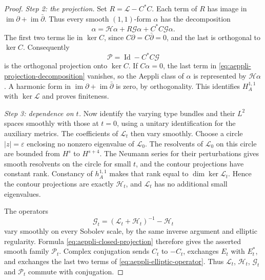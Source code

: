 \begin{proof}
\emph{Step 2: the projection.} Set $R=\mathcal L-C^*C$. Each term of $R$ has image in $\operatorname{im}\partial+\operatorname{im}\bar\partial$. Thus every smooth $(1,1)$-form $\alpha$ has the decomposition
\begin{equation}\label{eq:aeppli-projection-decomposition}
 \alpha=\mathcal H\alpha+R\mathcal G\alpha+C^*C\mathcal G\alpha.
\end{equation}
The first two terms lie in $\ker C$, since $C\partial=C\bar\partial=0$, and the last is orthogonal to $\ker C$. Consequently
\begin{equation}\label{eq:aeppli-closed-projection}
 \mathcal P=\operatorname{Id}-C^*C\mathcal G
\end{equation}
is the orthogonal projection onto $\ker C$. If $C\alpha=0$, the last term in \eqref{eq:aeppli-projection-decomposition} vanishes, so the Aeppli class of $\alpha$ is represented by $\mathcal H\alpha$. A harmonic form in $\operatorname{im}\partial+\operatorname{im}\bar\partial$ is zero, by orthogonality. This identifies $H_A^{1,1}$ with $\ker\mathcal L$ and proves finiteness.

\emph{Step 3: dependence on $t$.} Now identify the varying type bundles and their $L^2$ spaces smoothly with those at $t=0$, using a unitary identification for the auxiliary metrics. The coefficients of $\mathcal L_t$ then vary smoothly. Choose a circle $|z|=\varepsilon$ enclosing no nonzero eigenvalue of $\mathcal L_0$. The resolvents of $\mathcal L_0$ on this circle are bounded from $H^s$ to $H^{s+4}$. The Neumann series for their perturbations gives smooth resolvents on the circle for small $t$, and the contour projections have constant rank. Constancy of $h_A^{1,1}$ makes that rank equal to $\dim\ker\mathcal L_t$. Hence the contour projections are exactly $\mathcal H_t$, and $\mathcal L_t$ has no additional small eigenvalues.

The operators
\[
 \mathcal G_t=(\mathcal L_t+\mathcal H_t)^{-1}-\mathcal H_t
\]
vary smoothly on every Sobolev scale, by the same inverse argument and elliptic regularity. Formula \eqref{eq:aeppli-closed-projection} therefore gives the asserted smooth family $\mathcal P_t$. Complex conjugation sends $C_t$ to $-C_t$, exchanges $E_t$ with $E_t^*$, and exchanges the last two terms of \eqref{eq:aeppli-elliptic-operator}. Thus $\mathcal L_t$, $\mathcal H_t$, $\mathcal G_t$ and $\mathcal P_t$ commute with conjugation.
\end{proof}

